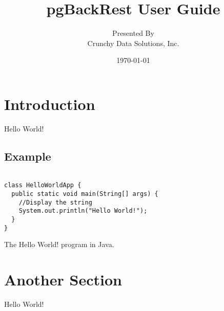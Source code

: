 \documentclass[titlepage]{article}
\begin{document}

\title{pgBackRest User Guide}
\author{Presented By\\
        Crunchy Data Solutions, Inc.}
\date{\today}
\maketitle

\renewcommand\contentsname{Table of Contents}
\tableofcontents
\newpage

\section{Introduction}

Hello World!

\subsection{Example}

\begin{program}
  \begin{verbatim}

class HelloWorldApp {
  public static void main(String[] args) {
    //Display the string
    System.out.println("Hello World!");
  }
}
\end{verbatim}
  \caption{The Hello World! program in Java.}
\end{program}


\section{Another Section}

Hello World!
\end{document}
